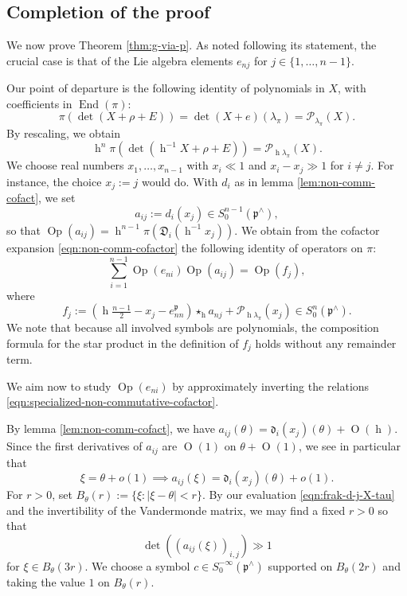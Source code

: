 \documentclass[reqno]{amsart}
\DeclareMathOperator{\h}{h}
\DeclareMathOperator{\End}{End}
\def\O{\operatorname{O}}
\DeclareMathOperator{\Opp}{Op}
\theoremstyle{plain} \newtheorem{theorem} {Theorem}
\theoremstyle{definition} \newtheorem{definition} [theorem] {Definition}
\theoremstyle{itplain} %
\numberwithin{equation}{section}
\numberwithin{theorem}{section}
\begin{document}
\subsection{Completion of the proof}\label{sec:completion-proof-2}
We now prove Theorem \ref{thm:g-via-p}.  As noted following its statement, the crucial case is that of the Lie algebra elements $e_{n j}$ for $j \in \{1,\dotsc,n-1\}$.

Our point of departure is the following identity of polynomials in $X$, with coefficients in $\End(\pi)$:
\[
  \pi(\det(X + \rho + E)) = \det(X+e)(\lambda_\pi) = \mathcal{P}_{\lambda_\pi}(X).
\]
By rescaling, we obtain
\[
  \h^{n} \pi(\det(\h^{-1} X + \rho + E)) = \mathcal{P}_{\h \lambda_\pi}(X).
\]
We choose real numbers $x_1,\dotsc,x_{n-1}$ with $x_i \ll 1$ and $x_i - x_j \gg 1$ for $i \neq j$.  For instance, the choice $x_j := j$ would do.  With $d_i$ as in lemma \ref{lem:non-comm-cofact}, we set
\begin{equation}\label{eq:aijdixj}
  a_{i j} := d_i(x_j) \in S^{n-1}_0(\mathfrak{p}^\wedge),
\end{equation}
so that $\Opp(a_{i j}) = \h^{n-1}\pi( \mathfrak{D}_i(\h^{-1} x_j))$.  We obtain from the cofactor expansion \eqref{eqn:non-comm-cofactor} the following identity of operators on $\pi$:
\begin{equation}\label{eqn:specialized-non-commutative-cofactor}
  \sum_{i=1}^{n-1}
  \Opp(e_{n i})
  \Opp(a_{i j})
  =
  \Opp(f_j),
\end{equation}
where
\[
  f_j := (\h \tfrac{n-1}{2} - x_j - e_{n n}^{\mathfrak{p}}) \star_{\h} a_{n j} + \mathcal{P}_{\h \lambda_\pi}(x_j) \in S^n_0(\mathfrak{p}^\wedge).
\]
We note that because all involved symbols are polynomials, the composition formula for the star product in the definition of $f_j$ holds without any remainder term.

We aim now to study $\Opp(e_{n i})$ by approximately inverting the relations \eqref{eqn:specialized-non-commutative-cofactor}.

By lemma \ref{lem:non-comm-cofact}, we have $a_{i j}(\theta) = \mathfrak{d}_i(x_j)(\theta) + \O(\h)$.  Since the first derivatives of $a_{i j}$ are $\O(1)$ on $\theta + \O(1)$, we see in particular that
\[
  \xi = \theta + o(1) \implies a_{i j}(\xi) = \mathfrak{d}_i(x_j)(\theta) + o(1).
\]
For $r > 0$, set $B_\theta(r) := \{\xi : |\xi - \theta| < r\}$.  By our evaluation \eqref{eqn:frak-d-j-X-tau} and the invertibility of the Vandermonde matrix, we may find a fixed $r > 0$ so that
\begin{equation}\label{eq:det-a_i-jxi_i}
\det( (a_{i j}(\xi))_{i,j}) \gg 1
\end{equation}
for $\xi \in B_\theta(3 r)$.  We choose a symbol $c \in S^{-\infty}_0(\mathfrak{p}^\wedge)$ supported on $B_\theta(2 r)$ and taking the value $1$ on $B_\theta(r)$.
\end{document}
